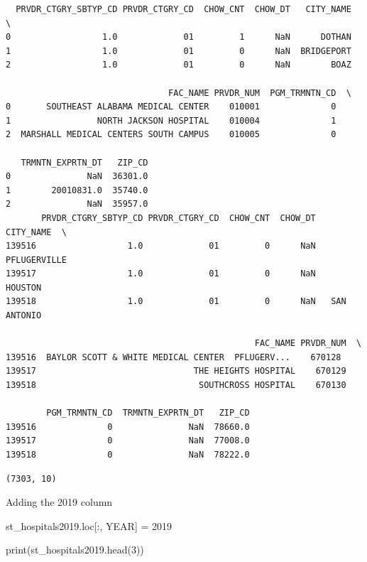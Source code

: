 \documentclass[
  letterpaper,
  DIV=11,
  numbers=noendperiod]{scrartcl}
\newenvironment{Shaded}{\begin{snugshade}}{\end{snugshade}}
\newcommand{\BuiltInTok}[1]{\textcolor[rgb]{0.00,0.23,0.31}{#1}}
\newcommand{\DecValTok}[1]{\textcolor[rgb]{0.68,0.00,0.00}{#1}}
\newcommand{\NormalTok}[1]{\textcolor[rgb]{0.00,0.23,0.31}{#1}}
\newcommand{\OperatorTok}[1]{\textcolor[rgb]{0.37,0.37,0.37}{#1}}
\newcommand{\StringTok}[1]{\textcolor[rgb]{0.13,0.47,0.30}{#1}}
\begin{document}
\begin{verbatim}
  PRVDR_CTGRY_SBTYP_CD PRVDR_CTGRY_CD  CHOW_CNT  CHOW_DT   CITY_NAME  \
0                  1.0             01         1      NaN      DOTHAN   
1                  1.0             01         0      NaN  BRIDGEPORT   
2                  1.0             01         0      NaN        BOAZ   

                                FAC_NAME PRVDR_NUM  PGM_TRMNTN_CD  \
0       SOUTHEAST ALABAMA MEDICAL CENTER    010001              0   
1                 NORTH JACKSON HOSPITAL    010004              1   
2  MARSHALL MEDICAL CENTERS SOUTH CAMPUS    010005              0   

   TRMNTN_EXPRTN_DT   ZIP_CD  
0               NaN  36301.0  
1        20010831.0  35740.0  
2               NaN  35957.0  
       PRVDR_CTGRY_SBTYP_CD PRVDR_CTGRY_CD  CHOW_CNT  CHOW_DT     CITY_NAME  \
139516                  1.0             01         0      NaN  PFLUGERVILLE   
139517                  1.0             01         0      NaN       HOUSTON   
139518                  1.0             01         0      NaN   SAN ANTONIO   

                                                 FAC_NAME PRVDR_NUM  \
139516  BAYLOR SCOTT & WHITE MEDICAL CENTER  PFLUGERV...    670128   
139517                               THE HEIGHTS HOSPITAL    670129   
139518                                SOUTHCROSS HOSPITAL    670130   

        PGM_TRMNTN_CD  TRMNTN_EXPRTN_DT   ZIP_CD  
139516              0               NaN  78660.0  
139517              0               NaN  77008.0  
139518              0               NaN  78222.0  
\end{verbatim}

\begin{verbatim}
(7303, 10)
\end{verbatim}

Adding the 2019 column

\begin{Shaded}
\begin{Highlighting}[]
\NormalTok{st\_hospitals2019.loc[:, }\StringTok{\textquotesingle{}YEAR\textquotesingle{}}\NormalTok{] }\OperatorTok{=} \DecValTok{2019}

\BuiltInTok{print}\NormalTok{(st\_hospitals2019.head(}\DecValTok{3}\NormalTok{))}
\end{Highlighting}
\end{Shaded}
\end{document}
